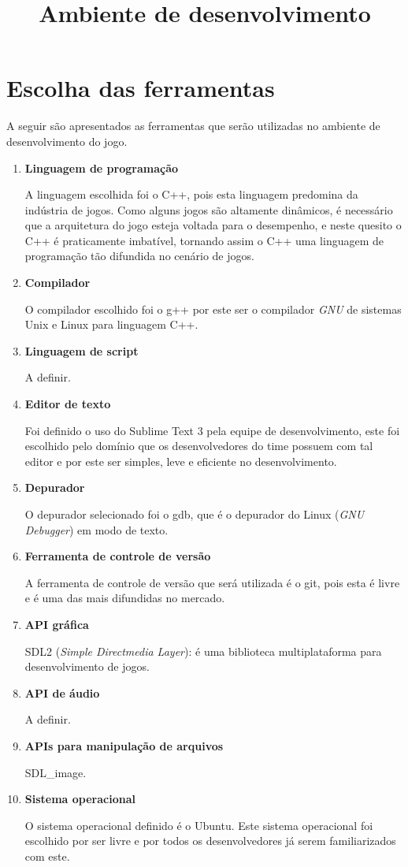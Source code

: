 \documentclass[a4paper, 11pt]{article} %
\title{\textbf{Ambiente de desenvolvimento}} %
\makeatletter
\renewcommand{\maketitle}{ %
\begin{center} %
{\LARGE\@title} %

\vspace{20pt} %

\end{center}
}
\makeatother
\begin{document}
\maketitle %


\section*{Escolha das ferramentas}

A seguir são apresentados as ferramentas que serão utilizadas no ambiente de desenvolvimento do jogo.

\begin{enumerate}
\item \textbf{Linguagem de programação}

A linguagem escolhida foi o C++, pois esta linguagem predomina da indústria de jogos. Como alguns jogos são altamente dinâmicos, é necessário que a arquitetura do jogo esteja voltada para o desempenho, e neste quesito o C++ é praticamente imbatível, tornando assim o C++ uma linguagem de programação tão difundida no cenário de jogos.

\item \textbf{Compilador}

O compilador escolhido foi o g++ por este ser o compilador \textit{GNU} de sistemas Unix e Linux para linguagem C++.
\item \textbf{Linguagem de script}

A definir.
\item \textbf{Editor de texto}

Foi definido o uso do Sublime Text 3 pela equipe de desenvolvimento, este foi escolhido pelo domínio que os desenvolvedores do time possuem com tal editor e por este ser simples, leve e eficiente no desenvolvimento.
\item \textbf{Depurador}

O depurador selecionado foi o  gdb, que é o depurador do Linux (\textit{GNU Debugger}) em modo de texto.
\item \textbf{Ferramenta de controle de versão}

A ferramenta de controle de versão que será utilizada é o git, pois esta é livre e é uma das mais difundidas no mercado.
\item \textbf{API gráfica}

SDL2 (\textit{Simple Directmedia Layer}): é uma biblioteca multiplataforma para desenvolvimento de jogos.
\item \textbf{API de áudio}

A definir.
\item \textbf{APIs para manipulação de arquivos}

SDL\_image.
\item \textbf{Sistema operacional}

O sistema operacional definido é o Ubuntu. Este sistema operacional foi escolhido por ser livre e por todos os desenvolvedores já serem familiarizados com este.

\end{enumerate}
\end{document}
